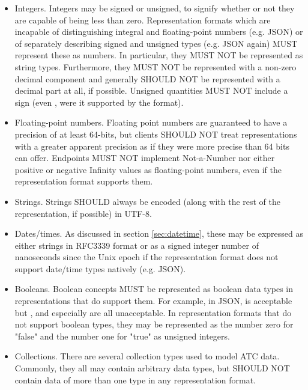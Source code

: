 \begin{itemize}
	\item Integers. Integers may be signed or unsigned, to signify whether or
	not they are capable of being less than zero. Representation formats which
	are incapable of distinguishing integral and floating-point numbers (e.g.
	JSON) or of separately describing signed and unsigned types (e.g. JSON
	again) MUST represent these as numbers. In particular, they MUST NOT be
	represented as string types. Furthermore, they MUST NOT be represented with
	a non-zero decimal component and generally SHOULD NOT be represented with a
	decimal part at all, if possible. Unsigned quantities MUST NOT include a
	sign (even \code{+}, were it supported by the format).

	\item Floating-point numbers. Floating point numbers are guaranteed to have
	a precision of at least 64-bits, but clients SHOULD NOT treat
	representations with a greater apparent precision as if they were more
	precise than 64 bits can offer. Endpoints MUST NOT implement Not-a-Number
	nor either positive or negative Infinity values as floating-point numbers,
	even if the representation format supports them.

	\item Strings. Strings SHOULD always be encoded (along with the rest of the
	representation, if possible) in UTF-8.

	\item Dates/times. As discussed in section \ref{sec:datetime}, these may be
	expressed as either strings in RFC3339 format or as a signed integer number
	of nanoseconds since the Unix epoch if the representation format does not
	support date/time types natively (e.g. JSON).

	\item Booleans. Boolean concepts MUST be represented as boolean data types
	in representations that do support them. For example, in JSON,
	 is acceptable but ,
	 and especially  are all unacceptable.
	In representation formats that do not support boolean types, they may be
	represented as the number zero for "false" and the number one for "true" as
	unsigned integers.

	\item Collections. There are several collection types used to model ATC
	data. Commonly, they all may contain arbitrary data types, but SHOULD NOT
	contain data of more than one type in any representation format.


\end{itemize}
